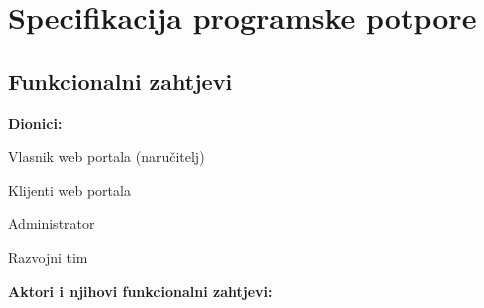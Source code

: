 \chapter{Specifikacija programske potpore}
		
	\section{Funkcionalni zahtjevi}
			
			\noindent \textbf{Dionici:}
			
			\begin{packed_enum}
				
				\item Vlasnik web portala (naručitelj)
				\item Klijenti web portala				
				\item Administrator
				\item Razvojni tim
				
			\end{packed_enum}
			
			\noindent \textbf{Aktori i njihovi funkcionalni zahtjevi:}
			
